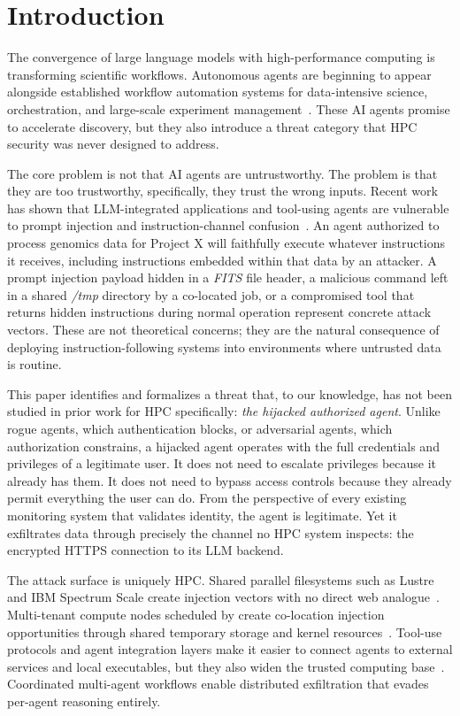 \section{Introduction}

The convergence of large language models with high-performance computing is transforming scientific workflows. Autonomous agents are beginning to appear alongside established workflow automation systems for data-intensive science, orchestration, and large-scale experiment management~\cite{deelman2015pegasus,babuji2019parsl,jain2015fireworks,xi2023agentsurvey}. These AI agents promise to accelerate discovery, but they also introduce a threat category that HPC security was never designed to address.

The core problem is not that AI agents are untrustworthy. The problem is that they are too trustworthy, specifically, they trust the wrong inputs. Recent work has shown that LLM-integrated applications and tool-using agents are vulnerable to prompt injection and instruction-channel confusion~\cite{greshake2023indirect,liu2024prompt,liu2023houyi}. An agent authorized to process genomics data for Project X will faithfully execute whatever instructions it receives, including instructions embedded within that data by an attacker. A prompt injection payload hidden in a \textit{FITS} file header, a malicious command left in a shared \textit{/tmp} directory by a co-located job, or a compromised tool that returns hidden instructions during normal operation represent concrete attack vectors. These are not theoretical concerns; they are the natural consequence of deploying instruction-following systems into environments where untrusted data is routine.

This paper identifies and formalizes a threat that, to our knowledge, has not been studied in prior work for HPC specifically: \textit{the hijacked authorized agent}. Unlike rogue agents, which authentication blocks, or adversarial agents, which authorization constrains, a hijacked agent operates with the full credentials and privileges of a legitimate user. It does not need to escalate privileges because it already has them. It does not need to bypass access controls because they already permit everything the user can do. From the perspective of every existing monitoring system that validates identity, the agent is legitimate. Yet it exfiltrates data through precisely the channel no HPC system inspects: the encrypted HTTPS connection to its LLM backend.

The attack surface is uniquely HPC. Shared parallel filesystems such as Lustre and IBM Spectrum Scale create injection vectors with no direct web analogue~\cite{lustre2025intro,ibm2024spectrumscale}. Multi-tenant compute nodes scheduled by \slurm{} create co-location injection opportunities through shared temporary storage and kernel resources~\cite{yoo2003slurm}. Tool-use protocols and agent integration layers make it easier to connect agents to external services and local executables, but they also widen the trusted computing base~\cite{mcp2024spec,mialon2023augmented}. Coordinated multi-agent workflows enable distributed exfiltration that evades per-agent reasoning entirely.

